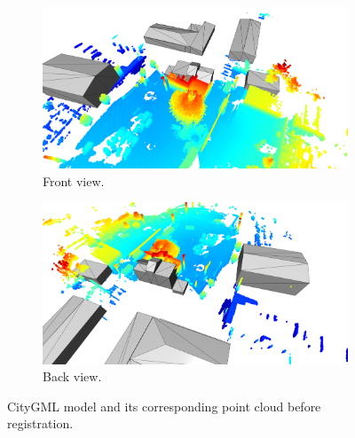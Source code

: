         \begin{figure}[H]
            \centering
            \begin{subfigure}{1\textwidth}
                \centering
                \includegraphics[scale=0.2]{images/solution_images/initial_front_model.png}
                \caption{Front view.}
                \label{fig:initial_front_model}
            \end{subfigure}
            \hfill
            \begin{subfigure}{1\textwidth}
                \centering
                \includegraphics[scale=0.2]{images/solution_images/initial_back_model.png}
                \caption{Back view.}
                \label{fig:initial_back_model}
            \end{subfigure}
            \caption{CityGML model and its corresponding point cloud before registration.}
            \label{fig:initial_CityGML}
        \end{figure}
        
        


